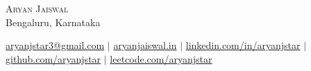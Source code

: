 

\begin{center}
    {\Huge \scshape Aryan Jaiswal} \\ \vspace{2pt}
    Bengaluru, Karnataka \\ \vspace{2pt}

    \footnotesize
    \href{mailto:aryanjstar3@gmail.com}{aryanjstar3@gmail.com} $|$
    \href{https://aryanjaiswal.in}{aryanjaiswal.in} $|$
    \href{https://linkedin.com/in/aryanjstar}{linkedin.com/in/aryanjstar} $|$
    \href{https://github.com/aryanjstar}{github.com/aryanjstar} $|$
    \href{https://leetcode.com/aryanjstar}{leetcode.com/aryanjstar}



    \vspace{-3.5pt}
\end{center}

